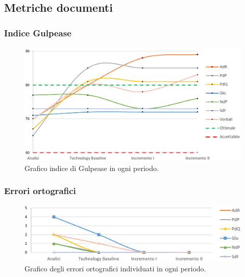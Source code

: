 \subsection{Metriche documenti}
\subsubsection{Indice Gulpease}

\begin{figure}[h]
	\centering
	\includegraphics[scale=0.55]{Images/gulpease nuovo}
	\caption{Graﬁco indice di Gulpease in ogni periodo.}
\end{figure}
\subsubsection{Errori ortografici}

\begin{figure}[h]
	\centering
	\includegraphics[scale=0.4]{Images/errori}
	\caption{Graﬁco degli errori ortograﬁci individuati in ogni periodo.}
\end{figure}